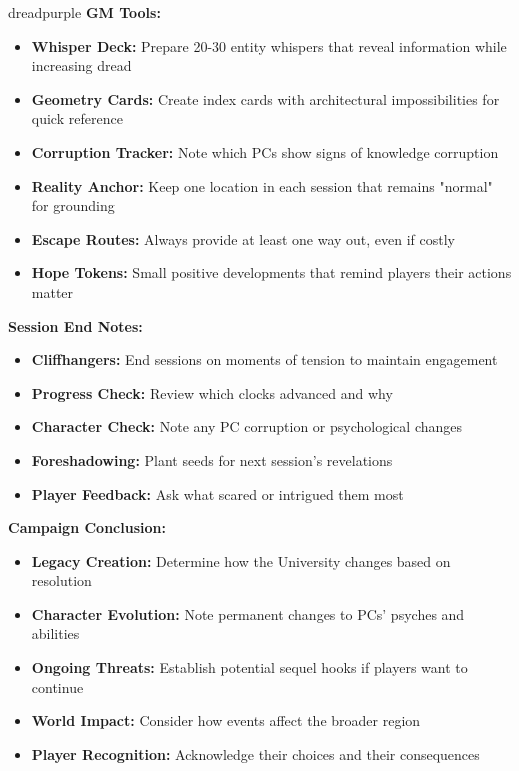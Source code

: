 \documentclass[11pt]{article}
\begin{document}
\begin{campaignsection}{dreadpurple}
\textbf{GM Tools:}
\begin{itemize}
    \item \textbf{Whisper Deck:} Prepare 20-30 entity whispers that reveal information while increasing dread
    \item \textbf{Geometry Cards:} Create index cards with architectural impossibilities for quick reference
    \item \textbf{Corruption Tracker:} Note which PCs show signs of knowledge corruption
    \item \textbf{Reality Anchor:} Keep one location in each session that remains "normal" for grounding
    \item \textbf{Escape Routes:} Always provide at least one way out, even if costly
    \item \textbf{Hope Tokens:} Small positive developments that remind players their actions matter
\end{itemize}

\textbf{Session End Notes:}
\begin{itemize}
    \item \textbf{Cliffhangers:} End sessions on moments of tension to maintain engagement
    \item \textbf{Progress Check:} Review which clocks advanced and why
    \item \textbf{Character Check:} Note any PC corruption or psychological changes
    \item \textbf{Foreshadowing:} Plant seeds for next session's revelations
    \item \textbf{Player Feedback:} Ask what scared or intrigued them most
\end{itemize}

\textbf{Campaign Conclusion:}
\begin{itemize}
    \item \textbf{Legacy Creation:} Determine how the University changes based on resolution
    \item \textbf{Character Evolution:} Note permanent changes to PCs' psyches and abilities
    \item \textbf{Ongoing Threats:} Establish potential sequel hooks if players want to continue
    \item \textbf{World Impact:} Consider how events affect the broader region
    \item \textbf{Player Recognition:} Acknowledge their choices and their consequences
\end{itemize}
\end{campaignsection}
\end{document}
